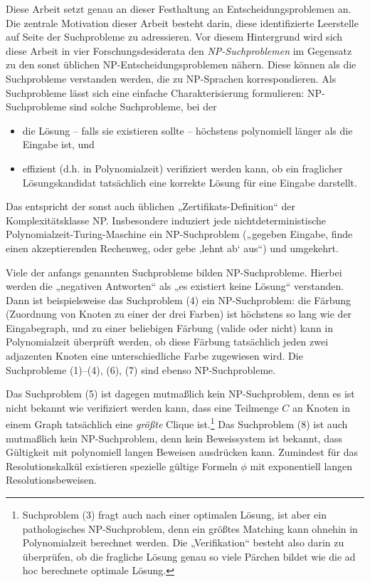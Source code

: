 Diese Arbeit setzt genau an dieser Festhaltung an Entscheidungsproblemen an. Die zentrale Motivation dieser Arbeit besteht darin, diese identifizierte Leerstelle auf Seite der Suchprobleme zu adressieren.  Vor diesem Hintergrund wird sich diese Arbeit in vier Forschungsdesiderata den \emph{NP-Suchproblemen} im Gegensatz zu den sonst üblichen NP-Entscheidungsproblemen nähern.
Diese können als die Suchprobleme verstanden werden, die zu NP-Sprachen korrespondieren. Als Suchprobleme lässt sich eine einfache Charakterisierung formulieren: NP-Suchprobleme sind solche Suchprobleme, bei der 
\begin{itemize}
    \item die Lösung – falls sie existieren sollte – höchstens polynomiell länger als die Eingabe ist, und 
    \item effizient (d.h. in Polynomialzeit) verifiziert werden kann, ob ein fraglicher Lösungskandidat tatsächlich eine korrekte Lösung für eine Eingabe darstellt.
\end{itemize}
Das entspricht der sonst auch üblichen „Zertifikats-Definition“ der Komplexitätsklasse NP. Insbesondere induziert jede nichtdeterministische Polynomialzeit-Turing-Maschine ein NP-Suchproblem („gegeben Eingabe, finde einen akzeptierenden Rechenweg, oder gebe ‚lehnt ab‘ aus“) und umgekehrt.

Viele der anfangs genannten Suchprobleme bilden NP-Suchprobleme. Hierbei werden die „negativen Antworten“ als „es existiert keine Lösung“ verstanden. Dann ist beispielsweise das Suchproblem (4) ein NP-Suchproblem: die Färbung (Zuordnung von Knoten zu einer der drei Farben) ist höchstens so lang wie der Eingabegraph, und zu einer beliebigen Färbung (valide oder nicht) kann in Polynomialzeit überprüft werden, ob diese Färbung tatsächlich jeden zwei adjazenten Knoten eine unterschiedliche Farbe zugewiesen wird.
Die Suchprobleme (1)–(4), (6), (7) sind ebenso NP-Suchprobleme. 

Das Suchproblem (5) ist dagegen mutmaßlich kein NP-Suchproblem, denn es ist nicht bekannt wie verifiziert werden kann, dass eine Teilmenge $C$ an Knoten in einem Graph tatsächlich eine \emph{größte} Clique ist.\footnote{Suchproblem (3) fragt auch nach einer optimalen Lösung, ist aber ein pathologisches NP-Suchproblem, denn ein größtes Matching kann ohnehin in Polynomialzeit berechnet werden. Die „Verifikation“ besteht also darin zu überprüfen, ob die fragliche Lösung genau so viele Pärchen bildet wie die ad hoc berechnete optimale Lösung.}
Das Suchproblem (8) ist auch mutmaßlich kein NP-Suchproblem, denn kein Beweissystem ist bekannt, dass Gültigkeit mit polynomiell langen Beweisen ausdrücken kann. Zumindest für das Resolutionskalkül existieren spezielle gültige Formeln $\phi$ mit exponentiell langen Resolutionsbeweisen.

